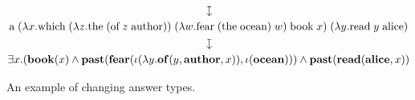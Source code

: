 \begin{landscape}
\begin{figure}
\begin{mdframed}
      \vspace*{-1\baselineskip}
      \begin{gather*}
        \downmapsto
        \\
        \text{a}\;(\lambda{x}.\text{which}\;
          (\lambda{z}.\text{the}\;(\text{of}\;z\;\text{author}))\;
          (\lambda{w}.\text{fear}\;(\text{the}\;\text{ocean})\;w)\;
          \text{book}\;x)\;
          (\lambda{y}.\text{read}\;y\;\text{alice})
        \\
        \downmapsto
        \\
        \exists{x}.
        (\BOOK(x)\wedge\PAST(\FEAR(\iota(\lambda{y}.\OF(y,\AUTHOR,x)),\iota(\OCEAN)))
        \wedge\PAST(\READ(\ALICE,x))
      \end{gather*}
    \end{mdframed}
    \caption{An example of changing answer types.}
    \label{fig:example-changing-answer-type}
  \end{figure}
\end{landscape}
%
